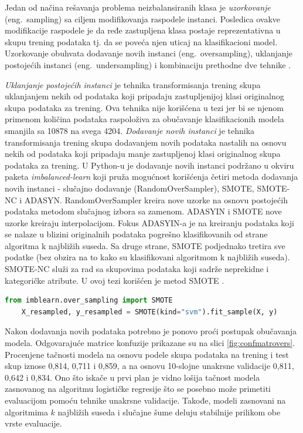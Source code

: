 \documentclass[12pt,oneside]{memoir}
\begin{document}
Jedan od načina rešavanja problema neizbalansiranih klasa je \textit{uzorkovanje} (eng.~sampling) sa ciljem modifikovanja raspodele instanci. Posledica ovakve modifikacije raspodele je da ređe zastupljena klasa postaje reprezentativna u skupu trening podataka tj. da se poveća njen uticaj na klasifikacioni model. Uzorkovanje obuhvata dodavanje novih instanci (eng.~oversampling), uklanjanje postojećih instanci (eng.~undersampling) i kombinaciju prethodne dve tehnike \cite{mitic, aggarwal}. 

\textit{Uklanjanje postojećih instanci} je tehnika transformisanja trening skupa uklanjanjem nekih od podataka koji pripadaju zastupljenijoj klasi originalnog skupa podataka za trening. Ova tehnika nije korišćena u tezi jer bi se njenom primenom količina podataka raspoloživa za obučavanje klasifikacionih modela smanjila sa 10878 na svega 4204.
\textit{Dodavanje novih instanci} je tehnika transformisanja trening skupa dodavanjem novih podataka nastalih na osnovu nekih od podataka koji pripadaju manje zastupljenoj klasi originalnog skupa podataka za trening. U Python-u je dodavanje novih instanci podržano u okviru paketa \textit{imbalanced-learn} koji pruža mogućnost korišćenja četiri metoda dodavanja novih instanci - slučajno dodavanje (RandomOverSampler), SMOTE, SMOTE-NC i ADASYN. RandomOverSampler kreira nove uzorke na osnovu postojećih podataka metodom slučajnog izbora sa zamenom. ADASYIN i SMOTE nove uzorke kreiraju interpolacijom. Fokus ADASYIN-a je na kreiranju podataka koji se nalaze u blizini originalnih podataka pogrešno klasifikovanih od strane algoritma k najbližih suseda. Sa druge strane, SMOTE podjednako tretira sve podatke (bez obzira na to kako su klasifikovani algoritmom k najbližih suseda). SMOTE-NC služi za rad sa skupovima podataka koji sadrže neprekidne i kategoričke atribute. U ovoj tezi korišćen je metod SMOTE \cite{imblearn, mitic}.

\begin{lstlisting}[language=Python, basicstyle=\tiny]
	from imblearn.over_sampling import SMOTE
	X_resampled, y_resampled = SMOTE(kind="svm").fit_sample(X, y)
\end{lstlisting}

Nakon dodavanja novih podataka potrebno je ponovo proći postupak obučavanja modela. Odgovarajuće matrice konfuzije prikazane su na slici \ref{fig:confmatrovers}. Procenjene tačnosti modela na osnovu podele skupa podataka na trening i test skup iznose 0,814, 0,711 i 0,859, a na osnovu 10-slojne unakrsne validacije 0,811, 0,642 i 0,834. Ono što iskače u prvi plan je vidno lošija tačnost modela zasnovanog na algoritmu logističke regresije što se posebno može primetiti evaluacijom pomoću tehnike unakrsne validacije. Takođe, modeli zasnovani na algoritmima $k$ najbližih suseda i slučajne šume deluju stabilnije prilikom obe vrste evaluacije. 
\end{document}
